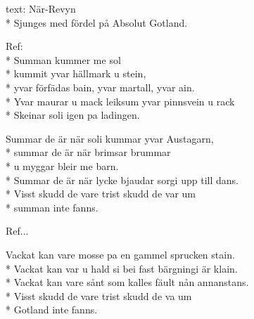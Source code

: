 \begin{SongText}
    \begin{SongInfo}
        text: När-Revyn\\*%
        Sjunges med fördel på Absolut Gotland.
    \end{SongInfo}
    \begin{SongVerse}
        Ref:\\*%
        Summan kummer me sol\\*%
        kummit yvar hällmark u stein,\\*%
        yvar förfädas bain, yvar martall, yvar ain.\\*%
        Yvar maurar u mack leiksum yvar pinnsvein u rack\\*%
        Skeinar soli igen pa ladingen.
    \end{SongVerse}
    \begin{SongVerse}
        Summar de är när soli kummar yvar Austagarn,\\*%
        summar de är när brimsar brummar\\*%
        u myggar bleir me barn.\\*%
        Summar de är när lycke bjaudar sorgi upp till dans.\\*%
        Visst skudd de vare trist skudd de var um\\*%
        summan inte fanns.
    \end{SongVerse}
    \begin{SongVerse}
        Ref...
    \end{SongVerse}
    \begin{SongVerse}
        Vackat kan vare mosse pa en gammel sprucken stain.\\*%
        Vackat kan var u hald si bei fast bärgningi är klain.\\*%
        Vackat kan vare sånt som kalles fäult nån annanstans.\\*%
        Visst skudd de vare trist skudd de va um\\*%
        Gotland inte fanns.
    \end{SongVerse}
\end{SongText}
